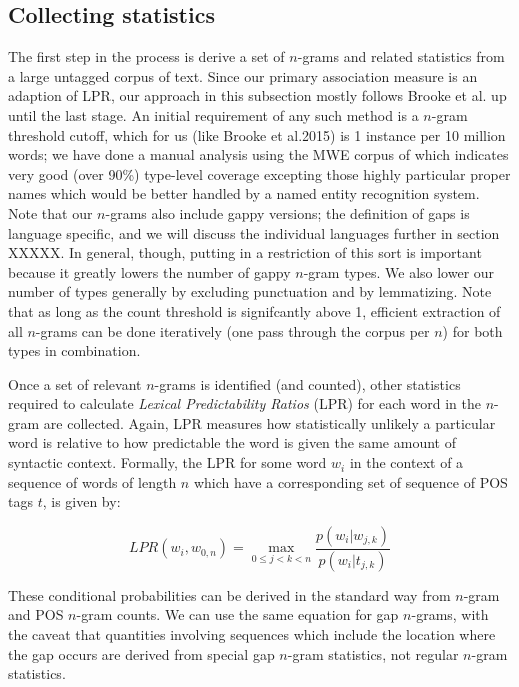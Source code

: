 \documentclass[11pt]{article}
\makeatletter
\def \al {al.\@ }
\makeatother
\begin{document}
\subsection{Collecting statistics}

The first step in the process is derive a set of $n$-grams and related statistics from a large untagged corpus of text. Since our primary association measure is an adaption of LPR, our approach in this subsection mostly follows Brooke et \al {} up until the last stage. An initial requirement of any such method is a $n$-gram threshold cutoff, which for us (like Brooke et \al 2015) is 1 instance per 10 million words; we have done a manual analysis using the MWE corpus of \cite{Schneider14a} which indicates very good (over 90\%) type-level coverage excepting those highly particular proper names which would be better handled by a named entity recognition system. Note that our $n$-grams also include gappy versions; the definition of gaps is language specific, and we will discuss the individual languages further in section XXXXX. In general, though, putting in a restriction of this sort is important because it greatly lowers the number of gappy $n$-gram types. We also lower our number of types generally by excluding punctuation and by lemmatizing.  Note that as long as the count threshold is signifcantly above 1, efficient extraction of all $n$-grams can be done iteratively (one pass through the corpus per $n$) for both types in combination. 

Once a set of relevant $n$-grams is identified (and counted), other statistics required to calculate \emph{Lexical Predictability Ratios} (LPR) for each word in the $n$-gram are collected. Again, LPR measures how statistically unlikely a particular word is relative to how predictable the word is given the same amount of syntactic context. Formally, the LPR for some word $w_i$ in the context of a sequence of words of length $n$ which have a corresponding set of sequence of POS tags $t$, is given by:

\begin{displaymath}
LPR(w_i,w_{0,n}) = \max_{0 \leq j < k < n }{\frac{p(w_i|w_{j,k})}{p(w_i|t_{j,k})}}
\end{displaymath}

These conditional probabilities can be derived in the standard way from $n$-gram and POS $n$-gram counts. We can use the same equation for gap $n$-grams, with the caveat that quantities involving sequences which include the location where the gap occurs are derived from special gap $n$-gram statistics, not regular $n$-gram statistics.  
\end{document}
